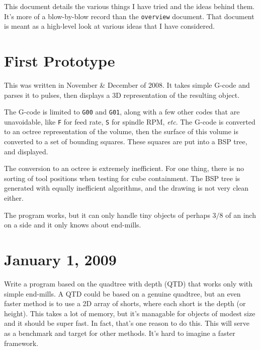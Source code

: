 \documentclass[titlepage,oneside,10pt]{article}
\begin{document}
\raggedbottom

\newcommand{\mymargin}[1]{\marginpar{\rm\tiny #1}}
\newcommand{\leftmar}[1]{\reversemarginpar \mymargin{#1}}

This document details the various things I have tried and the ideas
behind them. It's more of a blow-by-blow record than the {\tt overview}
document. That document is meant as a high-level look at various ideas
that I have considered. 

\section{First Prototype}

This was written in November \& December of 2008. It takes simple
G-code and parses it to pulses, then displays a 3D representation of
the resulting object.

The G-code is limited to {\tt G00} and {\tt G01}, along with a few
other codes that are unavoidable, like {\tt F} for feed rate, {\tt S}
for spindle RPM, \emph{etc}. The G-code is converted to an octree
representation of the volume, then the surface of this volume is
converted to a set of bounding squares. These squares are put into a
BSP tree, and displayed. 

The conversion to an octree is extremely inefficient. For one thing,
there is no sorting of tool positions when testing for cube
containment. The BSP tree is generated with equally inefficient
algorithms, and the drawing is not very clean either.

The program works, but it can only handle tiny objects of perhaps
$3/8$ of an inch on a side and it only knows about end-mills. 

\section{January 1, 2009}

Write a program based on the quadtree with depth (QTD) that works only
with simple end-mills. A QTD could be based on a genuine quadtree, but
an even faster method is to use a 2D array of shorts, where each short
is the depth (or height). This takes a lot of memory, but it's
managable for objects of modest size and it should be super fast. In
fact, that's one reason to do this. This will serve as a benchmark and
target for other methods. It's hard to imagine a faster framework.
\end{document}
